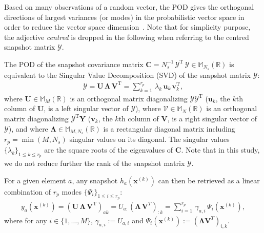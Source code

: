Based on many observations of a random vector, the POD gives the orthogonal directions of largest variances (or modes) in the probabilistic vector space in order to reduce the vector space dimension~\citep{chatterjee2000}. Note that for simplicity purpose, the adjective {\it centred} is dropped in the following when referring to the centred snapshot matrix $\mathcal{Y}$.

The POD of the snapshot covariance matrix $\mathbf{C} = N_{s}^{-1}\,\mathcal{Y}^{\mathrm{T}}\,\mathcal{Y}\in \mathbb{M}_{N_{s}}(\mathbb{R})$ is equivalent to the Singular Value Decomposition (SVD) of the snapshot matrix $\mathcal{Y}$:
\begin{align}
\mathcal{Y} = \mathbf{U}\,\mathbf{\Lambda}\,\mathbf{V}^{\mathrm{T}} = \displaystyle\sum_{k = 1}^{r_{p}}\,\lambda_k\,\mathbf{u}_k\,\mathbf{v}_k^{\mathrm{T}},
\end{align} 
where $\mathbf{U} \in \mathbb{M}_M(\mathbb{R})$ is an orthogonal matrix diagonalizing $\mathcal{Y}\mathcal{Y}^{\mathrm{T}}$ ($\mathbf{u}_k$, the $k$th column of $\mathbf{U}$, is a left singular vector of $\mathcal{Y}$), where $\mathcal{V} \in \mathbb{M}_N(\mathbb{R})$ is an orthogonal matrix diagonalizing $\mathcal{Y}^{\mathrm{T}}\mathbf{Y}$ ($\mathbf{v}_k$, the $k$th column of $\mathbf{V}$, is a right singular vector of $\mathcal{Y}$), and where $\mathbf{\Lambda} \in \mathbb{M}_{M,N_{s}}(\mathbb{R})$ is a rectangular diagonal matrix including $r_{p}=\min(M,N_{s})$ singular values on its diagonal. The singular values $\lbrace \lambda_k \rbrace_{1 \leq k \leq r_{p}}$ are the square roots of the eigenvalues of $\mathbf{C}$. 
Note that in this study, we do not reduce further the rank of the snapshot matrix $\mathcal{Y}$. %

For a given element $a$, any snapshot $h_a(\mathbf{x}^{(k)})$ can then be retrieved as a linear combination of $r_{p}$ modes $\{\Psi_i\}_{1\leq i \leq r_p}$:
\begin{align}\label{eq:gppod}
y_a(\mathbf{x}^{(k)}) 
= (\mathbf{U}\,\mathbf{\Lambda}\,\mathbf{V}^{\mathrm{T}})_{ak} 
= U_{a:}(\mathbf{\Lambda}\,\mathbf{V}^T)_{:k}=\sum_{i=1}^{r_{p}}\,\gamma_{a,i}\,\Psi_i(\mathbf{x}^{(k)}),
\end{align}
where for any $i\in\{1,\ldots,M\}$, $\gamma_{a,i}:=U_{a,i}$ and $\Psi_i(\mathbf{x}^{(k)}):=(\boldsymbol{\Lambda}\mathbf{V}^T)_{i,k}$. 
%


